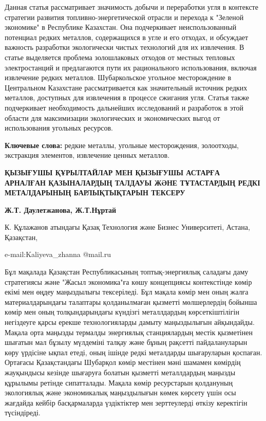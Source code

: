 Данная статья рассматривает значимость добычи и переработки угля в
контексте стратегии развития топливно-энергетической отрасли и перехода
к "Зеленой экономике" в Республике Казахстан. Она подчеркивает
неиспользованный потенциал редких металлов, содержащихся в угле и его
отходах, и обсуждает важность разработки экологически чистых технологий
для их извлечения. В статье выделяется проблема золошлаковых отходов от
местных тепловых электростанций и предлагаются пути их рационального
использования, включая извлечение редких металлов. Шубаркольское
угольное месторождение в Центральном Казахстане рассматривается как
значительный источник редких металлов, доступных для извлечения в
процессе сжигания угля. Статья также подчеркивает необходимость
дальнейших исследований и разработок в этой области для максимизации
экологических и экономических выгод от использования угольных ресурсов.

\textbf{Ключевые слова:} редкие металлы, угольные месторождения,
золоотходы, экстракция элементов, извлечение ценных металлов.

\textbf{ҚЫЗЫҒУШЫ ҚҰРЫЛТАЙЛАР МЕН ҚЫЗЫҒУШЫ АСТАРҒА АРНАЛҒАН ҚАЗЫНАЛАРДЫҢ
ТАЛДАУЫ ЖӘНЕ ТҰТАСТАРДЫҢ РЕДКІ МЕТАЛДАРЫНЫҢ БАРЛЫҚТЫҚТАРЫН ТЕКСЕРУ}

\textbf{Ж.Т. Даулетжанова, Ж.Т.Нұртай}

К. Құлажанов атындағы Қазақ Технология және Бизнес Университеті, Астана,
Қазақстан,

e-mail:Kaliyeva\_zhanna @mail.ru

Бұл мақалада Қазақстан Республикасының топтық-энергиялық саладағы даму
стратегиясы және "Жасыл экономика"ға көшу концепциясы контекстінде көмір
екімі мен өңдеу маңыздылығы тексеріледі. Бұл мақала көмір мен оның жалға
материалдарындағы талаптары қолданылмаған қызметті мөлшерлердің бойынша
көмір мен оның толқындарындағы күндізгі металлдардың көрсеткіштілігін
негіздеуге қарсы ерекше технологияларды дамыту маңыздылығын айқындайды.
Мақала орта маңызды термалды энергиялық станциялардың местік қызметінен
шығатын мал бұзылу мүлдеміні талқау және бұның рақсетті пайдалануларын
көру үрдісіне ықпал етеді, оның ішінде редкі металдарды шығаруларын
қоспаған. Ортағасы Қазақстандағы Шубарқол көмір местінен мәні шамамен
көмірдің жауқындысы кезінде шығаруға болатын қызметті металлдардың
маңызды құрылымы ретінде сипатталады. Мақала көмір ресурстарын
қолдануның экологиялық және экономикалық маңыздылығын көмек көрсету үшін
осы жағдайда кейбір басқармаларда үздіктіктер мен зерттеулерді өткізу
керектігін түсіндіреді.

